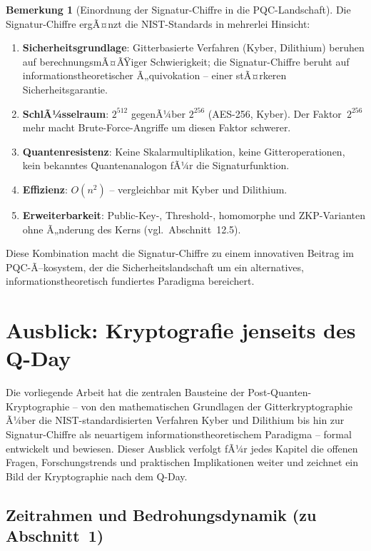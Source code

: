 ﻿\documentclass[a4paper,12pt]{article}
\theoremstyle{definition}
\newtheorem{bemerkung}{Bemerkung}[section]
\begin{document}
\begin{bemerkung}[Einordnung der Signatur-Chiffre in die PQC-Landschaft]
Die Signatur-Chiffre ergÃ¤nzt die NIST-Standards in mehrerlei Hinsicht:
\begin{enumerate}
\item \textbf{Sicherheitsgrundlage}: Gitterbasierte Verfahren (Kyber, Dilithium)
  beruhen auf berechnungsmÃ¤ÃŸiger Schwierigkeit; die Signatur-Chiffre beruht
  auf informationstheoretischer Ã„quivokation -- einer stÃ¤rkeren Sicherheitsgarantie.
\item \textbf{SchlÃ¼sselraum}: $2^{512}$ gegenÃ¼ber $2^{256}$ (AES-256, Kyber).
  Der Faktor~$2^{256}$ mehr macht Brute-Force-Angriffe um diesen Faktor schwerer.
\item \textbf{Quantenresistenz}: Keine Skalarmultiplikation, keine Gitteroperationen,
  kein bekanntes Quantenanalogon fÃ¼r die Signaturfunktion.
\item \textbf{Effizienz}: $O(n^2)$ -- vergleichbar mit Kyber und Dilithium.
\item \textbf{Erweiterbarkeit}: Public-Key-, Threshold-, homomorphe und
  ZKP-Varianten ohne Ã„nderung des Kerns (vgl.\ Abschnitt~12.5).
\end{enumerate}
Diese Kombination macht die Signatur-Chiffre \cite{Epp26b} zu einem
innovativen Beitrag im PQC-Ã–kosystem, der die Sicherheitslandschaft
um ein alternatives, informationstheoretisch fundiertes Paradigma bereichert.
\end{bemerkung}

\section{Ausblick: Kryptografie jenseits des Q-Day}

Die vorliegende Arbeit hat die zentralen Bausteine der Post-Quanten-Kryptographie
-- von den mathematischen Grundlagen der Gitterkryptographie Ã¼ber die
NIST-standardisierten Verfahren Kyber und Dilithium bis hin zur
Signatur-Chiffre als neuartigem informationstheoretischem Paradigma --
formal entwickelt und bewiesen. Dieser Ausblick verfolgt fÃ¼r jedes
Kapitel die offenen Fragen, Forschungstrends und praktischen Implikationen
weiter und zeichnet ein Bild der Kryptographie nach dem Q-Day.

\subsection{Zeitrahmen und Bedrohungsdynamik (zu Abschnitt~1)}
\end{document}
